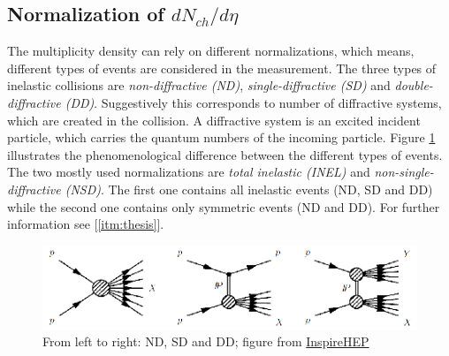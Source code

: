 \documentclass{article}
\newcommand\dNdEta{$dN_{ch}/d\eta$}
\begin{document}
\subsection{Normalization of \dNdEta}
The multiplicity density can rely on different normalizations, which means, different types of events are considered in the measurement.
The three types of inelastic collisions are \textit{non-diffractive (ND)}, \textit{single-diffractive (SD)} and \textit{double-diffractive (DD)}. Suggestively this corresponds to number of diffractive systems, which are created in the collision. A diffractive system is an excited incident particle, which carries the quantum numbers of the incoming particle. Figure \ref{fig:diff} illustrates the phenomenological difference between the different types of events. The two mostly used normalizations are \textit{total inelastic (INEL)} and \textit{non-single-diffractive (NSD)}. The first one contains all inelastic events (ND, SD and DD) while the second one contains only symmetric events (ND and DD). For further information see [\ref{itm:thesis}].
\begin{figure}
\centering
\includegraphics[width=\textwidth, natwidth=459, natheight=103]{images/diff.png}
\caption{From left to right: ND, SD and DD; figure from \href{www.inspirehep.net}{InspireHEP}}
\label{fig:diff}
\end{figure}
\end{document}
